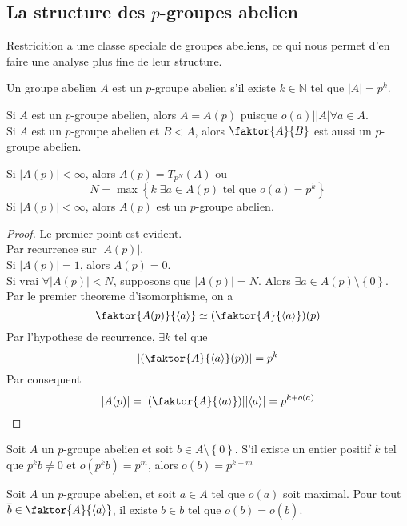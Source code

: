 \documentclass[../main.tex]{subfiles}
\begin{document}
\subsection{La structure des $p$-groupes abelien}
Restricition a une classe speciale de groupes abeliens, ce qui nous permet d'en faire une analyse plus fine de leur structure.
\begin{defn}
	Un groupe abelien $A$ est un $p$-groupe abelien s'il existe $k\in \mathbb{N}$ tel que $|A| = p^{k}$.
\end{defn}
\begin{rmq}
Si $A$ est un $p$-groupe abelien, alors $A= A( p) $ puisque $o( a) | |A|\forall a \in A$.\\
Si $A$ est un $p$-groupe abelien et $B<A$, alors $ \faktor{A}{B}$ est aussi un $p$-groupe abelien. 
\end{rmq}
\begin{lemma}
Si $|A( p) | < \infty $, alors $A( p) = T_{p^{N}} ( A) $ ou
\[ 
N = \max \left\{ k | \exists a \in A( p) \text{ tel que } o( a) = p^{k} \right\} 
\]
Si $|A( p) | < \infty $, alors $A( p) $ est un $p$-groupe abelien.
\end{lemma}
\begin{proof}
Le premier point est evident.\\
Par recurrence sur $|A( p) |$.\\
Si $|A( p) | =1$, alors $A( p) = 0$.\\
Si vrai $\forall |A( p) | < N$, supposons que $|A( p) | = N$. Alors $\exists a \in A( p) \setminus \left\{ 0 \right\} $.\\
Par le premier theoreme d'isomorphisme, on a 
\[ 
	\faktor{A( p) }{ \langle a\rangle} \simeq ( \faktor{A}{\langle a\rangle})( p)  
\]
Par l'hypothese de recurrence, $\exists k$ tel que
\[ 
| ( \faktor{A}{\langle a\rangle}( p) )| = p^{k} 
\]
Par consequent
\[ 
|A( p) | = | ( \faktor{A}{\langle a\rangle})| | \langle a \rangle| = p^{k+ o( a) }
\]

\end{proof}
\begin{lemma}
Soit $A$ un $p$-groupe abelien et soit $b \in A\setminus \left\{ 0\right\}$. S'il existe un entier positif $k$ tel que $ p^{k}b\neq 0$ et $ o( p^{k}b) = p^{m}$, alors $ o( b) = p^{k+m}$
\end{lemma}
\begin{lemma}
Soit $A$ un $p$-groupe abelien, et soit $a \in A$ tel que $o( a) $ soit maximal. Pour tout $\overline{b} \in \faktor{A}{\langle a\rangle}$, il existe $b \in \overline{b} $ tel que $o( b) = o ( \overline{b}) $.
\end{lemma}
\end{document}

